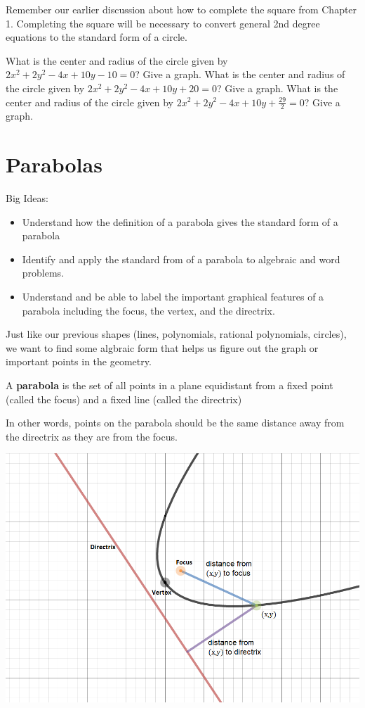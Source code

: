 Remember our earlier discussion about how to complete the square from Chapter 1. Completing the square will be necessary to convert general 2nd degree equations to the standard form of a circle.

\bq What is the center and radius of the circle given by $2x^2+2y^2-4x+10y-10=0$? Give a graph.
\eq
\bq What is the center and radius of the circle given by $2x^2+2y^2-4x+10y+20=0$? Give a graph.
\eq
\bq What is the center and radius of the circle given by $2x^2+2y^2-4x+10y+\frac{29}{2}=0$? Give a graph.
\eq
\section{Parabolas}
Big Ideas:
\begin{itemize}
\item Understand how the definition of a parabola gives the standard form of a parabola
\item Identify and apply the standard from of a parabola to algebraic and word problems.
\item Understand and be able to label the important graphical features of a parabola including the focus, the vertex, and the directrix.
\end{itemize}
Just like our previous shapes (lines, polynomials, rational polynomials, circles), we want to find some algbraic form that helps us figure out the graph or important points in the geometry.
\begin{info}
A \textbf{parabola} is the set of all points in a plane equidistant from a fixed point (called the focus)  and a fixed line (called the directrix)

In other words, points on the parabola should be the same distance away from the directrix as they are from the focus.
\end{info}

\begin{center}\includegraphics[scale=.45]{generalparabola2.png} \end{center}


